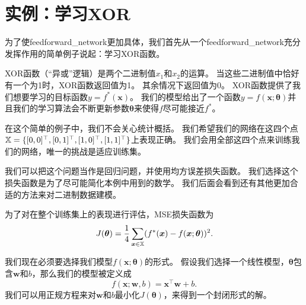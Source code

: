 \section{实例：学习XOR}
\label{sec:example_learning_xor}

为了使\gls{feedforward_network}更加具体，我们首先从一个\gls{feedforward_network}充分发挥作用的简单例子说起：学习XOR函数。

XOR函数（``异或''逻辑）是两个二进制值$x_1$和$x_2$的运算。
当这些二进制值中恰好有一个为1时，XOR函数返回值为1。
其余情况下返回值为0。
XOR函数提供了我们想要学习的目标函数$y = f^*(\bm{x})$。
我们的模型给出了一个函数$y=f(\bm{x}; \bm{\theta})$并且我们的学习算法会不断更新参数$\bm{\theta}$来使得$f$尽可能接近$f^*$。

在这个简单的例子中，我们不会关心统计概括。
我们希望我们的网络在这四个点$\mathbb{X} =\{[0, 0]^\top, [0, 1]^\top, [1, 0]^\top, [1, 1]^\top\}$上表现正确。
我们会用全部这四个点来训练我们的网络，唯一的挑战是适应训练集。

我们可以把这个问题当作是回归问题，并使用均方误差损失函数。
我们选择这个损失函数是为了尽可能简化本例中用到的数学。
我们后面会看到还有其他更加合适的方法来对二进制数据建模。


为了对在整个训练集上的表现进行评估，MSE损失函数为
\begin{equation}
J(\bm{\theta}) = \frac{1}{4} \sum_{\bm{x}\in \mathbb{X}} (f^*(\bm{x}) - f(\bm{x}; \bm{\theta}))^2.
\end{equation}

我们现在必须要选择我们模型$f(\bm{x}; \bm{\theta})$的形式。
假设我们选择一个线性模型，$\bm{\theta}$包含$\bm{w}$和$b$，那么我们的模型被定义成
\begin{equation}
f(\bm{x}; \bm{w}, b) = \bm{x}^\top \bm{w} + b.
\end{equation}
我们可以用正规方程来对$\bm{w}$和$b$最小化$J(\bm{\theta})$，来得到一个封闭形式的解。

